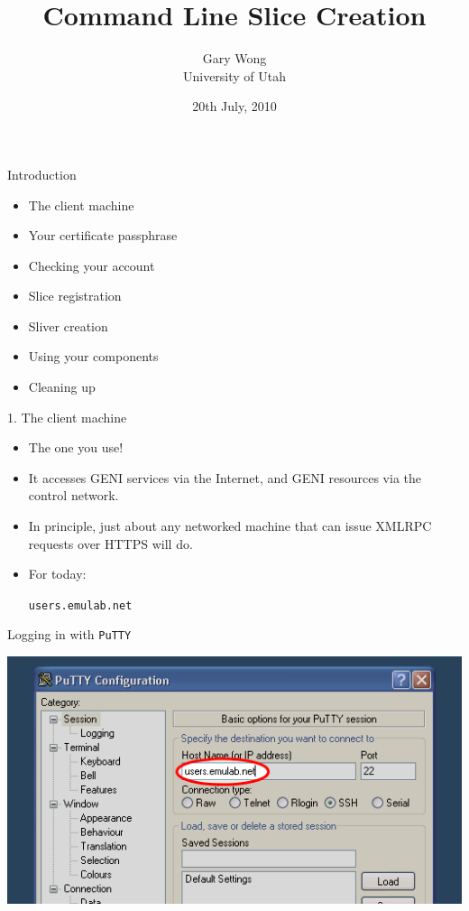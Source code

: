 \documentclass[landscape]{slides}
\title{Command Line Slice Creation}
\author{Gary Wong\\ University of Utah}
\date{20th July, 2010}
\newcommand{\heading}[1]{{\fontseries{b}\selectfont\begin{center}{\LARGE\color{red} #1}\end{center}}}
\newcommand{\code}[1]{\begin{center}{\tt #1}\end{center}}
\begin{document}
\selectfont
\maketitle

\begin{slide}
\heading{Introduction}
\begin{small}
\begin{itemize}
\item The client machine
\item Your certificate passphrase
\item Checking your account
\item Slice registration
\item Sliver creation
\item Using your components
\item Cleaning up
\end{itemize}
\end{small}
\end{slide}

\begin{slide}
\heading{1. The client machine}
\begin{itemize}
\item The one you use!
\item It accesses GENI services via the Internet, and GENI resources via the
  control network.
\item In principle, just about any networked machine that can issue
  XMLRPC requests over HTTPS will do.
\item For today:
\code{users.emulab.net}
\end{itemize}
\end{slide}

\begin{slide}
\heading{Logging in with {\tt PuTTY}}
\begin{center}
\includegraphics[width=17cm]{putty-1}
\end{center}
\end{slide}
\end{document}
